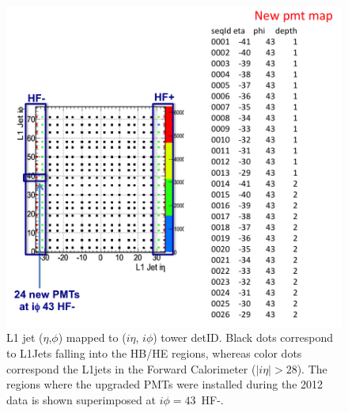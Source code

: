 \documentclass[11pt]{cmspaperpdf}
\begin{document}
\begin{figure}
\centering
\includegraphics[scale=0.7]{plots/upgradedPMTs_regions_in2012.png}
\caption{L1 jet ($\eta$,$\phi$) mapped to ($i \eta$, $i \phi$) tower detID. Black dots correspond to L1Jets falling into the HB/HE regions, whereas color dots correspond the L1jets in the Forward Calorimeter ($| i \eta| > 28$). The regions where the upgraded PMTs were installed during the 2012 data is shown superimposed at $i \phi=43$~HF-. }
\label{fig:newpmts} 
\end{figure}
 
\end{document}
